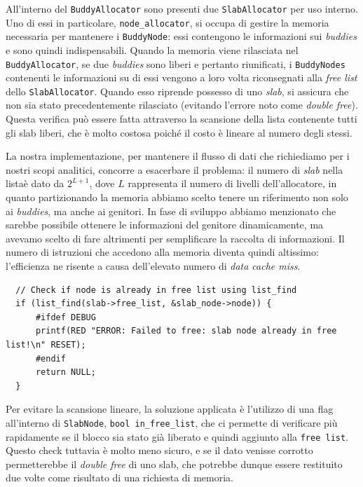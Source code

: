 All'interno del \texttt{BuddyAllocator} sono presenti due \texttt{SlabAllocator} per uso interno. Uno di essi in particolare, \texttt{node\_allocator}, si occupa di gestire la memoria necessaria per mantenere i \texttt{BuddyNode}: essi contengono le informazioni sui \textit{buddies} e sono quindi indispensabili. Quando la memoria viene rilasciata nel \texttt{BuddyAllocator}, se due \textit{buddies} sono liberi e pertanto riunificati, i \texttt{BuddyNodes} contenenti le informazioni su di essi vengono a loro volta riconsegnati alla \textit{free list} dello \texttt{SlabAllocator}. Quando esso riprende possesso di uno \textit{slab}, si assicura che non sia stato precedentemente rilasciato (evitando l'errore noto come \textit{double free}). Questa verifica può essere fatta attraverso la scansione della lista contenente tutti gli slab liberi, che è molto costosa poiché il costo è lineare al numero degli stessi. 

La nostra implementazione, per mantenere il flusso di dati che richiediamo per i nostri scopi analitici, concorre a esacerbare il problema: il numero di \textit{slab} nella lista\footnotemark è dato da $2^{L+1}$, dove $L$ rappresenta il numero di livelli dell'allocatore, in quanto partizionando la memoria abbiamo scelto tenere un riferimento non solo ai \textit{buddies}, ma anche ai genitori. In fase di sviluppo abbiamo menzionato che sarebbe possibile ottenere le informazioni del genitore dinamicamente, ma avevamo scelto di fare altrimenti per semplificare la raccolta di informazioni. Il numero di istruzioni che accedono alla memoria diventa quindi altissimo: l'efficienza ne risente a causa dell'elevato numero di \textit{data cache miss}.


\begin{lstlisting}
  // Check if node is already in free list using list_find
  if (list_find(slab->free_list, &slab_node->node)) {
      #ifdef DEBUG
      printf(RED "ERROR: Failed to free: slab node already in free list!\n" RESET);
      #endif
      return NULL;
  }
\end{lstlisting}

Per evitare la scansione lineare, la soluzione applicata è l'utilizzo di una flag all'interno di \texttt{SlabNode}, \texttt{bool in\_free\_list}, che ci permette di verificare più rapidamente se il blocco sia stato già liberato e quindi aggiunto alla \texttt{free list}. Questo check tuttavia è molto meno sicuro, e se il dato venisse corrotto permetterebbe il \textit{double free} di uno slab, che potrebbe dunque essere restituito due volte come risultato di una richiesta di memoria. 

